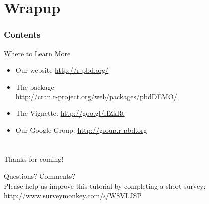 \section{Wrapup}

\hidenum
\begin{frame}[noframenumbering]
\frametitle{Contents}
 \tableofcontents[currentsection,hideothersubsections,sectionstyle=show/hide]
\end{frame}
\shownum

\begin{frame}
  \begin{block}{Where to Learn More}
    \begin{itemize}
      \item Our website \url{http://r-pbd.org/}
      \item The  package\\
      \url{http://cran.r-project.org/web/packages/pbdDEMO/}\\
      \item The  Vignette: \url{http://goo.gl/HZkRt}
      \item Our Google Group: \url{http://group.r-pbd.org}
    \end{itemize}
\end{block}
\end{frame}


\section*{}


%   
%   


\hidenum
\begin{frame}[noframenumbering]
 \begin{block}{Thanks for coming!}
 \begin{center}
     {\Large Questions?  Comments?}\\[.4cm]
     Please help us improve this tutorial by completing a short survey:\\
     \url{http://www.surveymonkey.com/s/W8VLJSP}
  \end{center}
 \end{block}
\end{frame}
